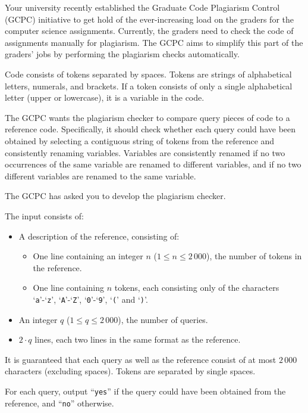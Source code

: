 \problemname{}

%
Your university recently established the Graduate Code Plagiarism Control (GCPC) initiative to get hold of the ever-increasing load on the graders for the computer science assignments.
Currently, the graders need to check the code of assignments manually for plagiarism.
The GCPC aims to simplify this part of the graders' jobs by performing the plagiarism checks automatically.

Code consists of tokens separated by spaces. Tokens are strings of alphabetical letters, numerals, and brackets. If a token consists of only a single alphabetical letter (upper or lowercase), it is a variable in the code.

The GCPC wants the plagiarism checker to compare query pieces of code to a reference code.
Specifically, it should check whether each query could have been obtained by selecting a contiguous
string of tokens from the reference and consistently renaming variables.
Variables are consistently renamed if no two occurrences of the same variable are renamed to different variables,
and if no two different variables are renamed to the same variable.

The GCPC has asked you to develop the plagiarism checker.

\begin{Input}
    The input consists of:
    \begin{itemize}
        \item A description of the reference, consisting of:
            \begin{itemize}
                \item One line containing an integer $n$ ($1\leq n \leq 2\,000$), the number of tokens in the reference.
                \item One line containing $n$ tokens, each consisting only of the characters `\texttt{a}'-`\texttt{z}', `\texttt{A}'-`\texttt{Z}', `\texttt{0}'-`\texttt{9}', `\texttt{(}' and `\texttt{)}'.
            \end{itemize}
        \item An integer $q$ ($1 \leq q \leq 2\,000$), the number of queries.
        \item $2\cdot q$ lines, each two lines in the same format as the reference.
    \end{itemize}
    It is guaranteed that each query as well as the reference consist of at most $2\,000$ characters (excluding spaces).
    Tokens are separated by single spaces.
\end{Input}

\begin{Output}
    For each query, output ``\texttt{yes}'' if the query could have been obtained from the reference, and ``\texttt{no}'' otherwise.
\end{Output}
